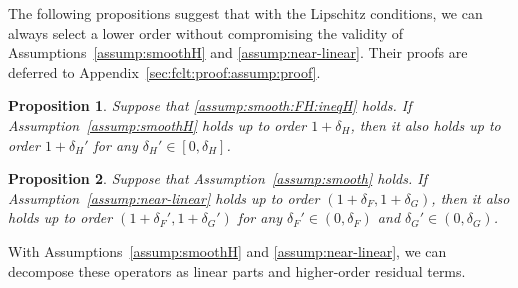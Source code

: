 \documentclass[11pt]{article}
\theoremstyle{plain}
\newtheorem{prop}{Proposition}[section]
\theoremstyle{definition}
\def\Hsmooth{{\delta_H}}
\def\Fsmooth{{\delta_F}}
\def\Gsmooth{{\delta_G}}
\begin{document}
\begin{appendix}

The following propositions suggest that with the Lipschitz conditions, we can always select a lower order without compromising the validity of Assumptions~\ref{assump:smoothH} and \ref{assump:near-linear}.
Their proofs are deferred to Appendix~\ref{sec:fclt:proof:assump:proof}.

\begin{prop}\label{prop:H-reduce-order}
Suppose that \eqref{assump:smooth:FH:ineqH} holds.
If Assumption~\ref{assump:smoothH} holds up to order $1 + \Hsmooth$, then it also holds up to order $1+\Hsmooth'$ for any $\Hsmooth' \in [0, \Hsmooth] $.
\end{prop}

\begin{prop}\label{prop:FG-reduce-order}
Suppose that Assumption~\ref{assump:smooth} holds.
If Assumption~\ref{assump:near-linear} holds up to order $(1+\Fsmooth, 1+\Gsmooth)$, then it also holds up to order $(1+\Fsmooth', 1+\Gsmooth')$ for any $\Fsmooth' \in (0, \Fsmooth)$ and $\Gsmooth' \in (0, \Gsmooth)$.
\end{prop}


With Assumptions~\ref{assump:smoothH} and \ref{assump:near-linear}, we can decompose these operators as linear parts and higher-order residual terms.


\end{appendix}
\end{document}
